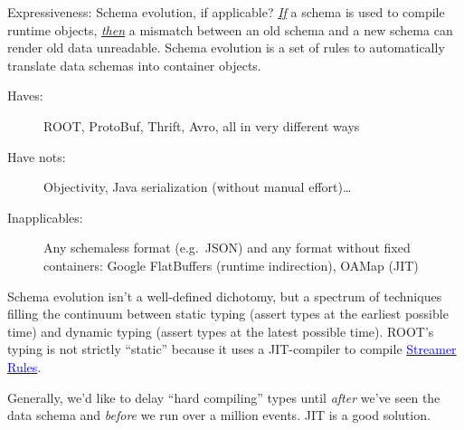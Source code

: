 \documentclass[aspectratio=169]{beamer}
\begin{document}
\begin{frame}{Expressiveness: Schema evolution, if applicable?}
\vspace{0.5 cm}
\underline{\it If} a schema is used to compile runtime objects, \underline{\it then} a mismatch between an old schema and a new schema can render old data unreadable. Schema evolution is a set of rules to automatically translate data schemas into container objects.

\begin{description}
\item[Haves:] ROOT, ProtoBuf, Thrift, Avro, all in very different ways
\item[Have nots:] Objectivity, Java serialization (without manual effort)\ldots
\item[Inapplicables:] Any schemaless format (e.g.\ JSON) and any format without fixed containers: Google FlatBuffers (runtime indirection), OAMap (JIT)
\end{description}

\vspace{0.25 cm}

Schema evolution isn't a well-defined dichotomy, but a spectrum of techniques filling the continuum between static typing (assert types at the earliest possible time) and dynamic typing (assert types at the latest possible time). ROOT's typing is not strictly ``static'' because it uses a JIT-compiler to compile \href{https://root.cern.ch/root/SchemaEvolution.pdf}{\textcolor{blue}{Streamer Rules}}.

\vspace{0.25 cm}

Generally, we'd like to delay ``hard compiling'' types until {\it after} we've seen the data schema and {\it before} we run over a million events. JIT is a good solution.

\end{frame}
\end{document}
